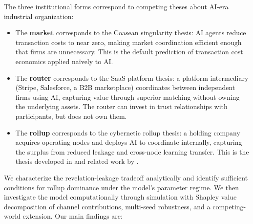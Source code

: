 \documentclass[12pt]{article}
\theoremstyle{definition}
\begin{document}
The three institutional forms correspond to competing theses about AI-era industrial organization:

\begin{itemize}[leftmargin=*]
\item The \textbf{market} corresponds to the Coasean singularity thesis: AI agents reduce transaction costs to near zero, making market coordination efficient enough that firms are unnecessary. This is the default prediction of transaction cost economics applied na\"ively to AI.

\item The \textbf{router} corresponds to the SaaS platform thesis: a platform intermediary (Stripe, Salesforce, a B2B marketplace) coordinates between independent firms using AI, capturing value through superior matching without owning the underlying assets. The router can invest in trust relationships with participants, but does not own them.

\item The \textbf{rollup} corresponds to the cybernetic rollup thesis: a holding company acquires operating nodes and deploys AI to coordinate internally, capturing the surplus from reduced leakage and cross-node learning transfer. This is the thesis developed in \citet{larson2025cybernetic} and related work by \citet{hobart2024routers}.
\end{itemize}

We characterize the revelation-leakage tradeoff analytically and identify sufficient conditions for rollup dominance under the model's parameter regime. We then investigate the model computationally through simulation with Shapley value decomposition of channel contributions, multi-seed robustness, and a competing-world extension. Our main findings are:
\end{document}
